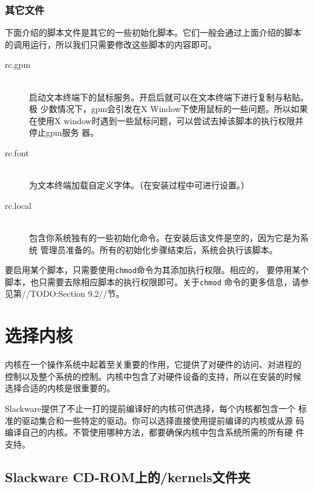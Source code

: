 \subsubsection{其它文件}
\label{sec:systemConfig:systemOverview:etcRcd:otherFiles}
下面介绍的脚本文件是其它的一些初始化脚本。它们一般会通过上面介绍的脚本
的调用运行，所以我们只需要修改这些脚本的内容即可。
\begin{description}
\item[rc.gpm] \hfill \\
  启动文本终端下的鼠标服务。开启后就可以在文本终端下进行复制与粘贴。极
  少数情况下，gpm会引发在X Window下使用鼠标的一些问题。所以如果在使用X
  window时遇到一些鼠标问题，可以尝试去掉该脚本的执行权限并停止gpm服务
  器。
\item[rc.font] \hfill \\
  为文本终端加载自定义字体。（在安装过程中可进行设置。）
\item[rc.local] \hfill \\
  包含你系统独有的一些初始化命令。在安装后该文件是空的，因为它是为系统
  管理员准备的。所有的初始化步骤结束后，系统会执行该脚本。
\end{description}

要启用某个脚本，只需要使用\texttt{chmod}命令为其添加执行权限。相应的，
要停用某个脚本，也只需要去除相应脚本的执行权限即可。关于\texttt{chmod}
命令的更多信息，请参见第//TODO:Section 9.2//节。

\section{选择内核}
\label{sec:systemConfig:selectingAKernel}
内核在一个操作系统中起着至关重要的作用，它提供了对硬件的访问、对进程的
控制以及整个系统的控制。内核中包含了对硬件设备的支持，所以在安装的时候
选择合适的内核是很重要的。

Slackware提供了不止一打的提前编译好的内核可供选择，每个内核都包含一个
标准的驱动集合和一些特定的驱动。你可以选择直接使用提前编译的内核或从源
码编译自己的内核。不管使用哪种方法，都要确保内核中包含系统所需的所有硬
件支持。

\subsection{Slackware CD-ROM上的/kernels文件夹}
\label{sec:systemConfig:selectingAKernel:kernelsDirctory}

